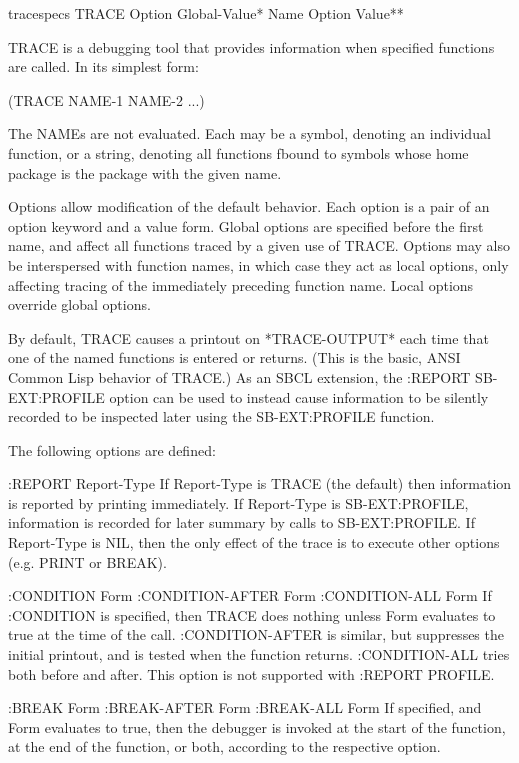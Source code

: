 \begin{macro}{trace}{\rest specs}{}{}
  TRACE {Option Global-Value}* {Name {Option Value}*}*

TRACE is a debugging tool that provides information when specified
functions are called. In its simplest form:

       (TRACE NAME-1 NAME-2 ...)

The NAMEs are not evaluated. Each may be a symbol, denoting an
individual function, or a string, denoting all functions fbound to
symbols whose home package is the package with the given name.

Options allow modification of the default behavior. Each option is a
pair of an option keyword and a value form. Global options are
specified before the first name, and affect all functions traced by a
given use of TRACE. Options may also be interspersed with function
names, in which case they act as local options, only affecting tracing
of the immediately preceding function name. Local options override
global options.

By default, TRACE causes a printout on *TRACE-OUTPUT* each time that
one of the named functions is entered or returns. (This is the basic,
ANSI Common Lisp behavior of TRACE.) As an SBCL extension, the
:REPORT SB-EXT:PROFILE option can be used to instead cause information
to be silently recorded to be inspected later using the SB-EXT:PROFILE
function.

The following options are defined:

   :REPORT Report-Type
       If Report-Type is TRACE (the default) then information is reported
       by printing immediately. If Report-Type is SB-EXT:PROFILE, information
       is recorded for later summary by calls to SB-EXT:PROFILE. If
       Report-Type is NIL, then the only effect of the trace is to execute
       other options (e.g. PRINT or BREAK).

   :CONDITION Form
   :CONDITION-AFTER Form
   :CONDITION-ALL Form
       If :CONDITION is specified, then TRACE does nothing unless Form
       evaluates to true at the time of the call. :CONDITION-AFTER is
       similar, but suppresses the initial printout, and is tested when the
       function returns. :CONDITION-ALL tries both before and after.
       This option is not supported with :REPORT PROFILE.

   :BREAK Form
   :BREAK-AFTER Form
   :BREAK-ALL Form
       If specified, and Form evaluates to true, then the debugger is invoked
       at the start of the function, at the end of the function, or both,
       according to the respective option.


\end{macro}
